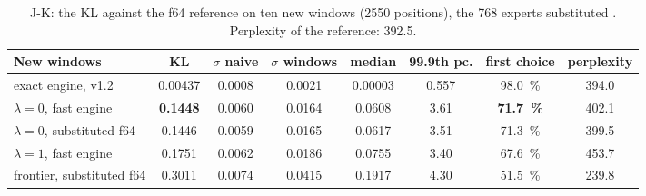 \begin{table}[ht]
\centering\footnotesize
\caption[J-K: the KL on the new windows]{J-K: the KL against the f64 reference on ten new windows (\num{2550} positions), the 768 experts substituted \mes. Perplexity of the reference: \num{392.5}.}
\label{t3jug:tab:jk}
\begin{tabular}{@{}lccccccc@{}}
\toprule
New windows & KL & $\sigma$ naive & $\sigma$ windows & median & 99.9th pc. & first choice & perplexity \\
\midrule
exact engine, v1.2 & \num{0.00437} & \num{0.0008} & \num{0.0021} & \num{0.00003} & \num{0.557} & \SI{98.0}{\percent} & \num{394.0} \\
$\lambda = 0$, fast engine & \textbf{\num{0.1448}} & \num{0.0060} & \num{0.0164} & \num{0.0608} & \num{3.61} & \textbf{\SI{71.7}{\percent}} & \num{402.1} \\
$\lambda = 0$, substituted f64 & \num{0.1446} & \num{0.0059} & \num{0.0165} & \num{0.0617} & \num{3.51} & \SI{71.3}{\percent} & \num{399.5} \\
$\lambda = 1$, fast engine & \num{0.1751} & \num{0.0062} & \num{0.0186} & \num{0.0755} & \num{3.40} & \SI{67.6}{\percent} & \num{453.7} \\
frontier, substituted f64 & \num{0.3011} & \num{0.0074} & \num{0.0415} & \num{0.1917} & \num{4.30} & \SI{51.5}{\percent} & \num{239.8} \\
\bottomrule
\end{tabular}
\end{table}

